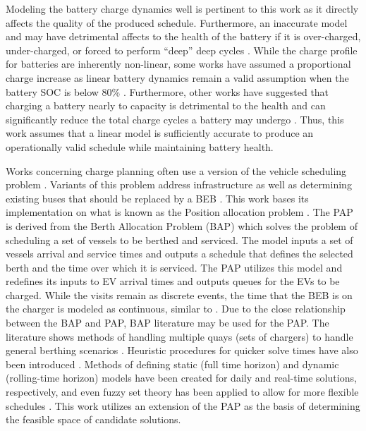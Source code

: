 \documentclass[ee,thesis]{usuthesis}
\begin{document}
Modeling the battery charge dynamics well is pertinent to this work as it directly affects the quality of the produced
schedule. Furthermore, an inaccurate model and may have detrimental affects to the health of the battery if it is
over-charged, under-charged, or forced to perform ``deep'' deep cycles \cite{zhou-2020-bi-objec,millner-2010-model-lithium,edge-2021-lithium}. While the charge profile for batteries are inherently non-linear, some
works have assumed a proportional charge increase as linear battery dynamics remain a valid assumption when the battery
SOC is below 80\% \cite{liu-2020-batter-elect}. Furthermore, other works have suggested that charging a battery nearly
to capacity is detrimental to the health and can significantly reduce the total charge cycles a battery may undergo
\cite{edge-2021-lithium,millner-2010-model-lithium}. Thus, this work assumes that a linear model is sufficiently
accurate to produce an operationally valid schedule while maintaining battery health.

Works concerning charge planning often use a version of the vehicle scheduling problem \cite{tang-2019-robus-sched,li-2014-trans-bus,he-2020-optim-charg}. Variants of this problem address infrastructure as well as determining
existing buses that should be replaced by a BEB \cite{zhou-2020-bi-objec,duan-2021-refor-mixed,rinaldi-2020-mixed-fleet,zhou-2020-collab-optim}. This work bases its implementation on what is known as the Position
allocation problem \cite{qarebagh-2019-optim-sched}. The PAP is derived from the Berth Allocation Problem (BAP) which
solves the problem of scheduling a set of vessels to be berthed and serviced. The model inputs a set of vessels arrival
and service times and outputs a schedule that defines the selected berth and the time over which it is serviced. The PAP
utilizes this model and redefines its inputs to EV arrival times and outputs queues for the EVs to be charged. While the
visits remain as discrete events, the time that the BEB is on the charger is modeled as continuous, similar to
\cite{frojan-2015-contin-berth,qarebagh-2019-optim-sched,zhou-2020-collab-optim}. Due to the close relationship
between the BAP and PAP, BAP literature may be used for the PAP. The literature shows methods of handling multiple quays
(sets of chargers) to handle general berthing scenarios \cite{frojan-2015-contin-berth,dai-2008-suppl-chain-analy}.
Heuristic procedures for quicker solve times have also been introduced \cite{imai-2001-dynam-berth}. Methods of
defining static (full time horizon) and dynamic (rolling-time horizon) models have been created for daily and real-time
solutions, respectively, and even fuzzy set theory has been applied to allow for more flexible schedules
\cite{bello-2019-fuzzy-activ,dai-2008-suppl-chain-analy,buhrkal-2011-model-discr,frojan-2015-contin-berth}. This
work utilizes an extension of the PAP as the basis of determining the feasible space of candidate solutions.
\end{document}
